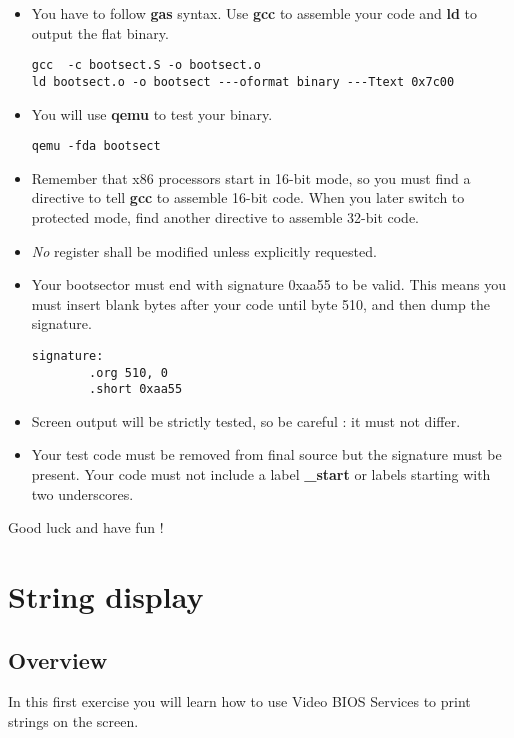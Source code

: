 \begin{itemize}
\item
  You have to follow \textbf{gas} syntax. Use \textbf{gcc} to assemble your
  code and \textbf{ld} to output the flat binary.
  \begin{verbatim}
gcc  -c bootsect.S -o bootsect.o
ld bootsect.o -o bootsect ---oformat binary ---Ttext 0x7c00
  \end{verbatim}
\item
  You will use \textbf{qemu} to test your binary.
  \begin{verbatim}
qemu -fda bootsect
  \end{verbatim}
\item
  Remember that x86 processors start in 16-bit mode, so you must find a
  directive to tell \textbf{gcc} to assemble 16-bit code. When you later
  switch to protected mode, find another directive to assemble 32-bit code.
\item
  \emph{No} register shall be modified unless explicitly requested.
\item
  Your bootsector must end with signature 0xaa55 to be valid. This means you
  must insert blank bytes after your code until byte 510, and then dump
  the signature.
  \begin{verbatim}
signature:
        .org 510, 0
        .short 0xaa55
  \end{verbatim}
\item
  Screen output will be strictly tested, so be careful : it must not differ.
\item
  Your test code must be removed from final source but the signature must be
  present. Your code must not include a label \textbf{\_start} or labels
  starting with two underscores.
\end{itemize}

Good luck and have fun !

%
%

\newpage

\section{String display}

\subsection*{Overview}
In this first exercise you will learn how to use Video BIOS Services to
print strings on the screen.

